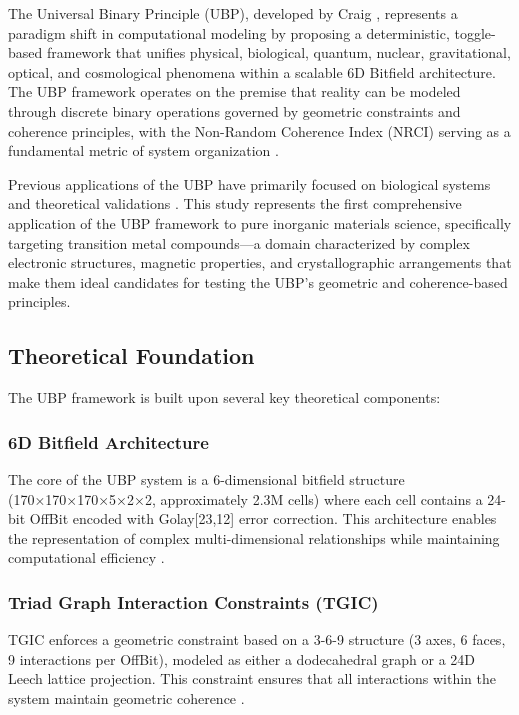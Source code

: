 \documentclass[12pt,a4paper]{article}
\begin{document}
The Universal Binary Principle (UBP), developed by Craig \cite{craig2025universal}, represents a paradigm shift in computational modeling by proposing a deterministic, toggle-based framework that unifies physical, biological, quantum, nuclear, gravitational, optical, and cosmological phenomena within a scalable 6D Bitfield architecture. The UBP framework operates on the premise that reality can be modeled through discrete binary operations governed by geometric constraints and coherence principles, with the Non-Random Coherence Index (NRCI) serving as a fundamental metric of system organization \cite{craig2025verification}.

Previous applications of the UBP have primarily focused on biological systems and theoretical validations \cite{craig2025universal}. This study represents the first comprehensive application of the UBP framework to pure inorganic materials science, specifically targeting transition metal compounds—a domain characterized by complex electronic structures, magnetic properties, and crystallographic arrangements that make them ideal candidates for testing the UBP's geometric and coherence-based principles.

\subsection{Theoretical Foundation}

The UBP framework is built upon several key theoretical components:

\subsubsection{6D Bitfield Architecture}
The core of the UBP system is a 6-dimensional bitfield structure (170×170×170×5×2×2, approximately 2.3M cells) where each cell contains a 24-bit OffBit encoded with Golay[23,12] error correction. This architecture enables the representation of complex multi-dimensional relationships while maintaining computational efficiency \cite{craig2025universal}.

\subsubsection{Triad Graph Interaction Constraints (TGIC)}
TGIC enforces a geometric constraint based on a 3-6-9 structure (3 axes, 6 faces, 9 interactions per OffBit), modeled as either a dodecahedral graph or a 24D Leech lattice projection. This constraint ensures that all interactions within the system maintain geometric coherence \cite{craig2025verification}.
\end{document}
